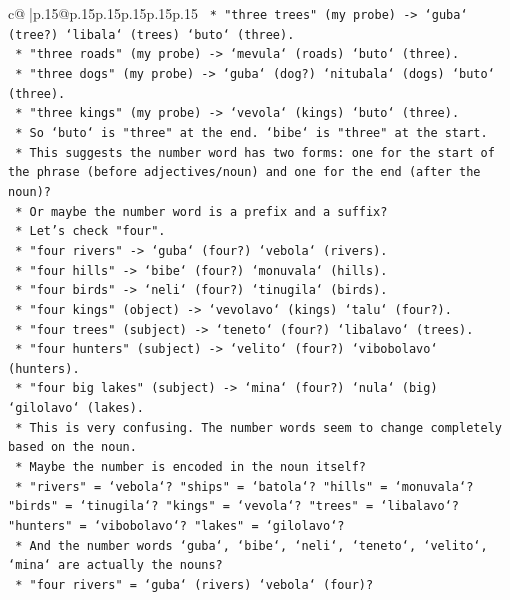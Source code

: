 \documentclass{article}
\begin{document}
{\begin{supertabular}{c@{$\;$}|p{.15\linewidth}@{}p{.15\linewidth}p{.15\linewidth}p{.15\linewidth}p{.15\linewidth}p{.15\linewidth}}
{{{\texttt{        *   "three trees" (my probe) {-}> `guba` (tree?) `libala` (trees) `buto` (three).} \\
\texttt{        *   "three roads" (my probe) {-}> `mevula` (roads) `buto` (three).} \\
\texttt{        *   "three dogs" (my probe) {-}> `guba` (dog?) `nitubala` (dogs) `buto` (three).} \\
\texttt{        *   "three kings" (my probe) {-}> `vevola` (kings) `buto` (three).} \\
\texttt{    *   So `buto` is "three" at the end. `bibe` is "three" at the start.} \\
\texttt{    *   This suggests the number word has two forms: one for the start of the phrase (before adjectives/noun) and one for the end (after the noun)?} \\
\texttt{    *   Or maybe the number word is a prefix and a suffix?} \\
\texttt{    *   Let's check "four".} \\
\texttt{        *   "four rivers" {-}> `guba` (four?) `vebola` (rivers).} \\
\texttt{        *   "four hills" {-}> `bibe` (four?) `monuvala` (hills).} \\
\texttt{        *   "four birds" {-}> `neli` (four?) `tinugila` (birds).} \\
\texttt{        *   "four kings" (object) {-}> `vevolavo` (kings) `talu` (four?).} \\
\texttt{        *   "four trees" (subject) {-}> `teneto` (four?) `libalavo` (trees).} \\
\texttt{        *   "four hunters" (subject) {-}> `velito` (four?) `vibobolavo` (hunters).} \\
\texttt{        *   "four big lakes" (subject) {-}> `mina` (four?) `nula` (big) `gilolavo` (lakes).} \\
\texttt{    *   This is very confusing. The number words seem to change completely based on the noun.} \\
\texttt{    *   Maybe the number is encoded in the noun itself?} \\
\texttt{    *   "rivers" = `vebola`? "ships" = `batola`? "hills" = `monuvala`? "birds" = `tinugila`? "kings" = `vevola`? "trees" = `libalavo`? "hunters" = `vibobolavo`? "lakes" = `gilolavo`?} \\
\texttt{    *   And the number words `guba`, `bibe`, `neli`, `teneto`, `velito`, `mina` are actually the nouns?} \\
\texttt{    *   "four rivers" = `guba` (rivers) `vebola` (four)?} \\
}}}
\end{supertabular}}
\end{document}
